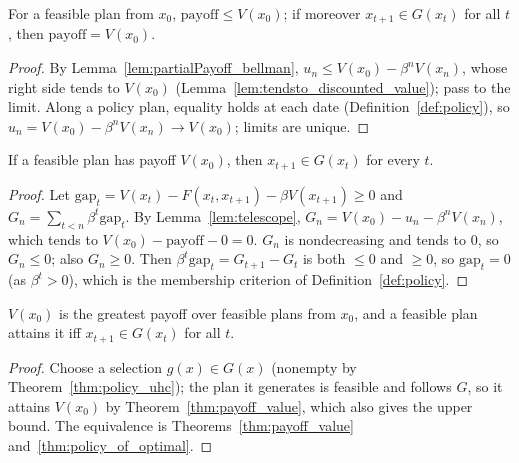 \begin{theorem}
\label{thm:payoff_value}
\leanok
{}
For a feasible plan from $x_0$, $\text{payoff} \le V(x_0)$; if moreover $x_{t+1} \in G(x_t)$ for all $t$,
then $\text{payoff} = V(x_0)$.
\end{theorem}
\begin{proof}
\leanok
By Lemma~\ref{lem:partialPayoff_bellman}, $u_n \le V(x_0) - \beta^n V(x_n)$, whose right side tends to
$V(x_0)$ (Lemma~\ref{lem:tendsto_discounted_value}); pass to the limit. Along a policy plan, equality
holds at each date (Definition~\ref{def:policy}), so $u_n = V(x_0) - \beta^n V(x_n) \to V(x_0)$; limits
are unique.
\end{proof}

\begin{theorem}
\label{thm:policy_of_optimal}
\leanok
{}
If a feasible plan has payoff $V(x_0)$, then $x_{t+1} \in G(x_t)$ for every $t$.
\end{theorem}
\begin{proof}
\leanok
Let $\mathrm{gap}_t = V(x_t) - F(x_t, x_{t+1}) - \beta V(x_{t+1}) \ge 0$ and
$G_n = \sum_{t<n} \beta^t \mathrm{gap}_t$. By Lemma~\ref{lem:telescope},
$G_n = V(x_0) - u_n - \beta^n V(x_n)$, which tends to $V(x_0) - \text{payoff} - 0 = 0$. $G_n$ is
nondecreasing and tends to $0$, so $G_n \le 0$; also $G_n \ge 0$. Then
$\beta^t \mathrm{gap}_t = G_{t+1} - G_t$ is both $\le 0$ and $\ge 0$, so $\mathrm{gap}_t = 0$ (as
$\beta^t > 0$), which is the membership criterion of Definition~\ref{def:policy}.
\end{proof}

\begin{theorem}
\label{thm:principle_of_optimality}
\leanok
{}
$V(x_0)$ is the greatest payoff over feasible plans from $x_0$, and a feasible plan attains it iff
$x_{t+1} \in G(x_t)$ for all $t$.
\end{theorem}
\begin{proof}
\leanok
Choose a selection $g(x) \in G(x)$ (nonempty by Theorem~\ref{thm:policy_uhc}); the plan it generates is
feasible and follows $G$, so it attains $V(x_0)$ by Theorem~\ref{thm:payoff_value}, which also gives the
upper bound. The equivalence is Theorems~\ref{thm:payoff_value} and~\ref{thm:policy_of_optimal}.
\end{proof}

